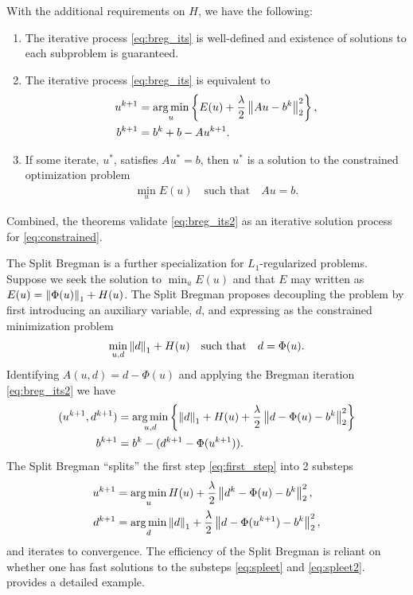 \begin{thm}
	With the additional requirements on $H$, we have the following:
	\begin{enumerate}
		\item The iterative process \eqref{eq:breg_its} is well-defined and existence of solutions to each subproblem is guaranteed.
		
		\item The iterative process \eqref{eq:breg_its} is equivalent to
		\begin{align}
		\begin{split} 
		u^{k+1} &= \operatorname*{arg\,min}_u \left\{ 
		E(u) + \frac{\lambda}{2} \left\lVert A u - b^k\right\rVert^2_2
		\right\},
		\\
		b^{k+1} &= b^k + b - Au^{k+1}.
		\end{split}
		\label{eq:breg_its2}
		\end{align}
		
		\item If some iterate, $u^*$, satisfies $Au^* = b$, then $u^*$ is a solution to the constrained optimization problem 
		\begin{align}
		\min_u E(u) \quad\text{such that}\quad Au = b.
		\label{eq:constrained}
		\end{align}
	\end{enumerate}
\end{thm}
Combined, the theorems validate \eqref{eq:breg_its2} as an iterative solution process for \eqref{eq:constrained}.

The Split Bregman is a further specialization for $L_1$-regularized problems. Suppose we seek the solution to $\min_u E(u)$ and that $E$ may written as $E(u) = \left\lVert\Phi(u)\right\rVert_1 + H(u)$. The Split Bregman proposes decoupling the problem by first introducing an auxiliary variable, $d$, and expressing as the constrained minimization problem 
\begin{align*}
\min_{u,d} \left\lVert d\right\rVert_1 + H(u)
\quad\text{such that}\quad d = \Phi(u).
\end{align*}
Identifying $A(u,d) = d - \Phi(u)$ and applying the Bregman iteration \eqref{eq:breg_its2} we have 
\begin{align}
(u^{k+1}, d^{k+1}) &= \operatorname*{arg\,min}_{u,d} \left\{
\left\lVert d\right\rVert_1 + H(u) + \frac{\lambda}{2}\left\lVert d - \Phi(u) - b^k\right\rVert^2_2 
\right\}
\label{eq:first_step}
\\ 
b^{k+1} 
&= b^k - (d^{k+1} - \Phi(u^{k+1})).
\end{align}
The Split Bregman ``splits'' the first step \eqref{eq:first_step} into 2 substeps
\begin{align}
u^{k+1} &= \operatorname*{arg\,min}_u H(u) + \frac{\lambda}{2} \left\lVert d^k - \Phi(u) - b^k\right\rVert^2_2 ,
\label{eq:spleet}
\\
d^{k+1} &= \operatorname*{arg\,min}_d \left\lVert d\right\rVert_1 + \frac{\lambda}{2} \left\lVert d - \Phi(u^{k+1}) - b^k\right\rVert^2_2, 
\label{eq:spleet2}
\end{align}
and iterates to convergence. The efficiency of the Split Bregman is reliant on whether one has fast solutions to the substeps \eqref{eq:spleet} and \eqref{eq:spleet2}.  provides a detailed example.


